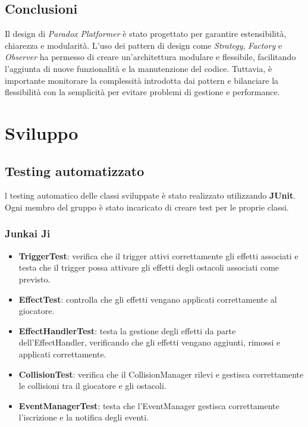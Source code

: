 \documentclass[a4paper,12pt]{report}
\begin{document}
	

\section{Conclusioni}
	
Il design di \textit{Paradox Platformer} è stato progettato per garantire estensibilità, chiarezza e modularità. L'uso dei pattern di design come \textit{Strategy}, \textit{Factory} e \textit{Observer} ha permesso di creare un'architettura modulare e flessibile, facilitando l'aggiunta di nuove funzionalità e la manutenzione del codice. Tuttavia, è importante monitorare la complessità introdotta dai pattern e bilanciare la flessibilità con la semplicità per evitare problemi di gestione e performance.
	
	
\chapter{Sviluppo}
\section{Testing automatizzato}

l testing automatico delle classi sviluppate è stato realizzato utilizzando \textbf{JUnit}. Ogni membro del gruppo è stato incaricato di creare test per le proprie classi.

\subsection*{Junkai Ji}
\begin{itemize}
\item \textbf{TriggerTest}: verifica che il trigger attivi correttamente gli effetti associati e testa che il trigger possa attivare gli effetti degli ostacoli associati come previsto.

\item \textbf{EffectTest}: controlla che gli effetti vengano applicati correttamente al giocatore.

\item \textbf{EffectHandlerTest}: testa la gestione degli effetti da parte dell’EffectHandler, verificando che gli effetti vengano aggiunti, rimossi e applicati correttamente.

\item \textbf{CollisionTest}: verifica che il CollisionManager rilevi e gestisca correttamente le collisioni tra il giocatore e gli ostacoli.

\item \textbf{EventManagerTest}: testa che l’EventManager gestisca correttamente l’iscrizione e la notifica degli eventi.
\end{itemize}
\end{document}
